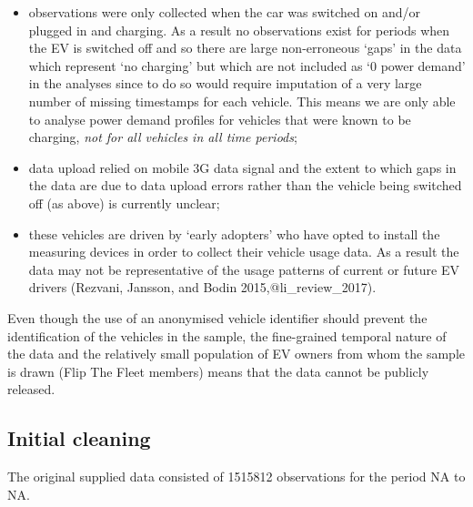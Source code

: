\documentclass[]{article}
\providecommand{\tightlist}{%
  \setlength{\itemsep}{0pt}\setlength{\parskip}{0pt}}
\begin{document}
\begin{itemize}
\tightlist
\item
  observations were only collected when the car was switched on and/or plugged in and charging. As a result no observations exist for periods when the EV is switched off and so there are large non-erroneous `gaps' in the data which represent `no charging' but which are not included as `0 power demand' in the analyses since to do so would require imputation of a very large number of missing timestamps for each vehicle. This means we are only able to analyse power demand profiles for vehicles that were known to be charging, \emph{not for all vehicles in all time periods};
\item
  data upload relied on mobile 3G data signal and the extent to which gaps in the data are due to data upload errors rather than the vehicle being switched off (as above) is currently unclear;
\item
  these vehicles are driven by `early adopters' who have opted to install the measuring devices in order to collect their vehicle usage data. As a result the data may not be representative of the usage patterns of current or future EV drivers (Rezvani, Jansson, and Bodin 2015,@li\_review\_2017).
\end{itemize}

Even though the use of an anonymised vehicle identifier should prevent the identification of the vehicles in the sample, the fine-grained temporal nature of the data and the relatively small population of EV owners from whom the sample is drawn (Flip The Fleet members) means that the data cannot be publicly released.

\hypertarget{cleaning}{%
\subsection{Initial cleaning}\label{cleaning}}

The original supplied data consisted of 1515812 observations for the period NA to NA.
\end{document}
